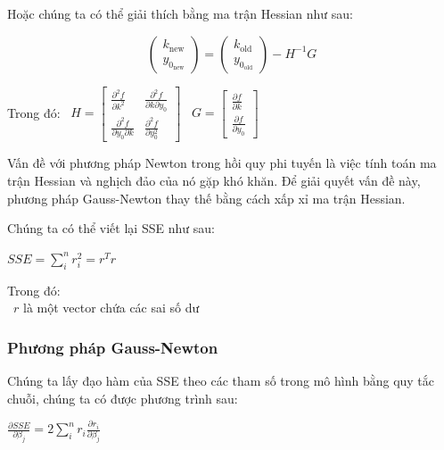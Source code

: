 \documentclass[conference]{IEEEtran}
\begin{document}
Hoặc chúng ta có thể giải thích bằng ma trận Hessian như sau:
\vspace{-4mm}
\begin{center}
    \[
        \begin{pmatrix}
            k_{\text{new}} \\ y_{0_\text{new}}
        \end{pmatrix} =
        \begin{pmatrix}
            k_{\text{old}} \\ y_{0_\text{old}}
        \end{pmatrix} - H^{-1}G
    \]
\end{center}

Trong đó: \indent \textbullet\ \( H = \begin{bmatrix}
    \frac{\partial^2 f}{\partial k^2}            & \frac{\partial^2 f}{\partial k \partial y_0} \\
    \frac{\partial^2 f}{\partial y_0 \partial k} & \frac{\partial^2 f}{\partial y_0^2}
\end{bmatrix} \) \quad \textbullet\ \( G = \begin{bmatrix}
    \frac{\partial f}{\partial k} \\ \frac{\partial f}{\partial y_0}
\end{bmatrix} \)


Vấn đề với phương pháp Newton trong hồi quy phi tuyến là việc tính toán ma trận Hessian và nghịch đảo của nó gặp khó khăn. Để giải quyết vấn đề này, phương pháp Gauss-Newton thay thế bằng cách xấp xỉ ma trận Hessian.

Chúng ta có thể viết lại SSE như sau:
\begin{center}
    $SSE = \sum_{i}^{n}r_i^2 = r^T r$
\end{center}

Trong đó: \\
\indent\textbullet\ \(r\) là một vector chứa các sai số dư \\

\subsubsection{Phương pháp Gauss-Newton}
Chúng ta lấy đạo hàm của SSE theo các tham số trong mô hình bằng quy tắc chuỗi, chúng ta có được phương trình sau:
\begin{center}
    \(
    \frac{\partial SSE}{\partial \beta_j} = 2\sum_{i}^{n} r_i \frac{\partial r_i}{\partial \beta_j}
    \)
\end{center}
\end{document}
